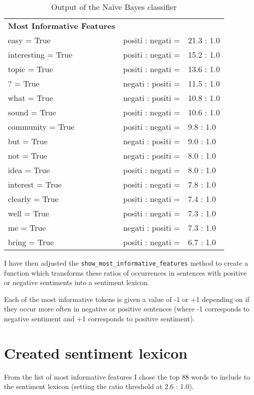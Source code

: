 \begin{table}[htbp!]
\caption{Output of the Na\"ive Bayes classifier}\label{tab:nbc_output}
\centering
\begin{tabular}{lll}
\textbf{Most Informative Features} &                   &            \\
easy = True                        & positi : negati = & 21.3 : 1.0 \\
interesting = True                 & positi : negati = & 15.2 : 1.0 \\
topic = True                       & positi : negati = & 13.6 : 1.0 \\
? = True                           & negati : positi = & 11.5 : 1.0 \\
what = True                        & negati : positi = & 10.8 : 1.0 \\
sound = True                       & positi : negati = & 10.6 : 1.0 \\
community = True                   & positi : negati = & 9.8 : 1.0  \\
but = True                         & negati : positi = & 9.0 : 1.0  \\
not = True                         & negati : positi = & 8.0 : 1.0  \\
idea = True                        & positi : negati = & 8.0 : 1.0  \\
interest = True                    & positi : negati = & 7.8 : 1.0  \\
clearly = True                     & positi : negati = & 7.4 : 1.0  \\
well = True                        & positi : negati = & 7.3 : 1.0  \\
me = True                          & negati : positi = & 7.3 : 1.0  \\
bring = True                       & positi : negati = & 6.7 : 1.0 
\end{tabular}
\end{table}
I have then adjusted the \texttt{show\_most\_informative\_features} method to create a function which transforms these ratios of occurrences in sentences with positive or negative sentiments into a sentiment lexicon. 

Each of the most informative tokens is given a value of -1 or +1 depending on if they occur more often in negative or positive sentences (where -1 corresponds to negative sentiment and  +1 corresponds to positive sentiment). 

\section{Created sentiment lexicon}
From the list of most informative features I chose the top 88 words to include to the sentiment lexicon (setting the ratio threshold at 2.6 : 1.0). 

